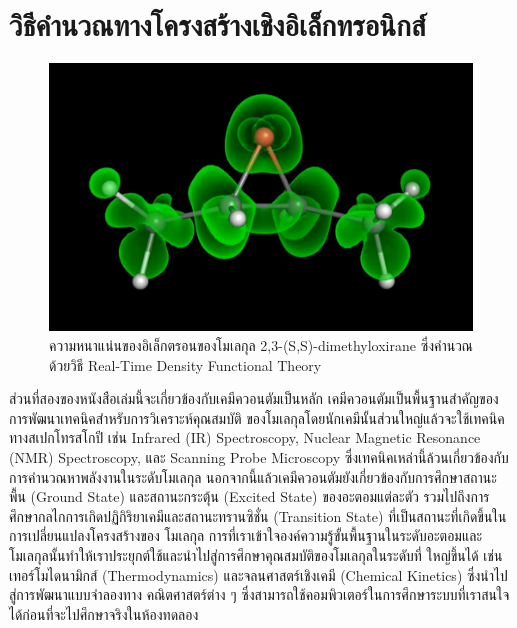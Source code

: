 

\chapter{วิธีคำนวณทางโครงสร้างเชิงอิเล็กทรอนิกส์}
\label{ch:el_strct}

\begin{figure}[H]
    \centering
    \includegraphics[width=0.9\linewidth]{fig/electron_density.png}
    \caption{ความหนาแน่นของอิเล็กตรอนของโมเลกุล 2,3-(S,S)-dimethyloxirane ซึ่งคำนวณด้วยวิธี Real-Time Density
        Functional Theory}
    \label{fig:elec_density}
\end{figure}

ส่วนที่สองของหนังสือเล่มนี้จะเกี่ยวข้องกับเคมีควอนตัมเป็นหลัก เคมีควอนตัมเป็นพื้นฐานสำคัญของการพัฒนาเทคนิคสำหรับการวิเคราะห์คุณสมบัติ%
ของโมเลกุลโดยนักเคมีนั้นส่วนใหญ่แล้วจะใช้เทคนิคทางสเปกโทรสโกปี เช่น Infrared (IR) Spectroscopy, Nuclear Magnetic Resonance
(NMR) Spectroscopy, และ Scanning Probe Microscopy ซึ่งเทคนิคเหล่านี้ล้วนเกี่ยวข้องกับการคำนวณหาพลังงานในระดับโมเลกุล
นอกจากนี้แล้วเคมีควอนตัมยังเกี่ยวข้องกับการศึกษาสถานะพื้น (Ground State) และสถานะกระตุ้น (Excited State) ของอะตอมแต่ละตัว
รวมไปถึงการศึกษากลไกการเกิดปฏิกิริยาเคมีและสถานะทรานซิชั่น (Transition State) ที่เป็นสถานะที่เกิดขึ้นในการเปลี่ยนแปลงโครงสร้างของ%
โมเลกุล การที่เราเข้าใจองค์ความรู้ขั้นพื้นฐานในระดับอะตอมและโมเลกุลนั้นทำให้เราประยุกต์ใช้และนำไปสู่การศึกษาคุณสมบัติของโมเลกุลในระดับที่%
ใหญ่ขึ้นได้ เช่น เทอร์โมไดนามิกส์ (Thermodynamics) และจลนศาสตร์เชิงเคมี (Chemical Kinetics) ซึ่งนำไปสู่การพัฒนาแบบจำลองทาง%
คณิตศาสตร์ต่าง ๆ ซึ่งสามารถใช้คอมพิวเตอร์ในการศึกษาระบบที่เราสนใจได้ก่อนที่จะไปศึกษาจริงในห้องทดลอง

